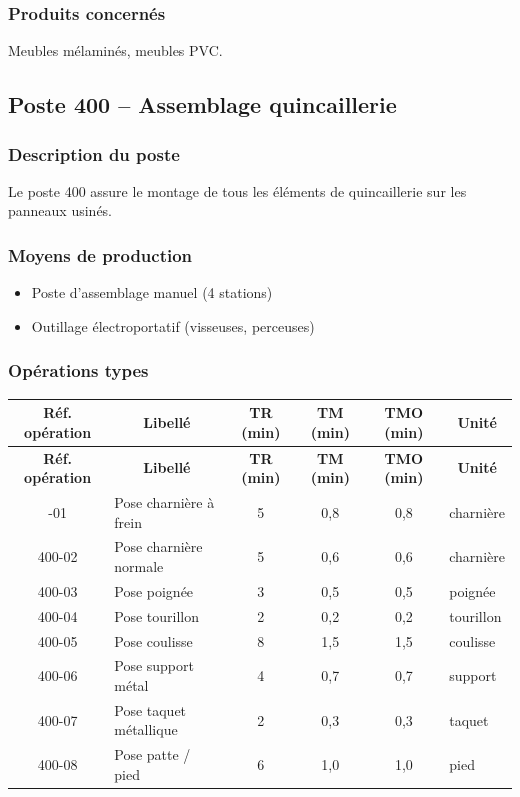 \documentclass[12pt,a4paper]{article}
\begin{document}
\subsubsection{Produits concernés}
Meubles mélaminés, meubles PVC.

\subsection{Poste 400 – Assemblage quincaillerie}

\subsubsection{Description du poste}
Le poste 400 assure le montage de tous les éléments de quincaillerie sur les panneaux usinés.

\subsubsection{Moyens de production}
\begin{itemize}
    \item Poste d'assemblage manuel (4 stations)
    \item Outillage électroportatif (visseuses, perceuses)
\end{itemize}

\subsubsection{Opérations types}

\begin{longtable}{|c|p{5cm}|c|c|c|p{3cm}|}
\hline
\multicolumn{1}{|c|}{\textbf{Réf. opération}} & \multicolumn{1}{c|}{\textbf{Libellé}} & \multicolumn{1}{c|}{\textbf{TR (min)}} & \multicolumn{1}{c|}{\textbf{TM (min)}} & \multicolumn{1}{c|}{\textbf{TMO (min)}} & \multicolumn{1}{c|}{\textbf{Unité}} \\
\hline
\endfirsthead
\hline
\multicolumn{1}{|c|}{\textbf{Réf. opération}} & \multicolumn{1}{c|}{\textbf{Libellé}} & \multicolumn{1}{c|}{\textbf{TR (min)}} & \multicolumn{1}{c|}{\textbf{TM (min)}} & \multicolumn{1}{c|}{\textbf{TMO (min)}} & \multicolumn{1}{c|}{\textbf{Unité}} \\
\hline
\endhead
\hline
\endfoot
400-01 & Pose charnière à frein & 5 & 0,8 & 0,8 & charnière \\
400-02 & Pose charnière normale & 5 & 0,6 & 0,6 & charnière \\
400-03 & Pose poignée & 3 & 0,5 & 0,5 & poignée \\
400-04 & Pose tourillon & 2 & 0,2 & 0,2 & tourillon \\
400-05 & Pose coulisse & 8 & 1,5 & 1,5 & coulisse \\
400-06 & Pose support métal & 4 & 0,7 & 0,7 & support \\
400-07 & Pose taquet métallique & 2 & 0,3 & 0,3 & taquet \\
400-08 & Pose patte / pied & 6 & 1,0 & 1,0 & pied \\
\hline
\end{longtable}
\end{document}
